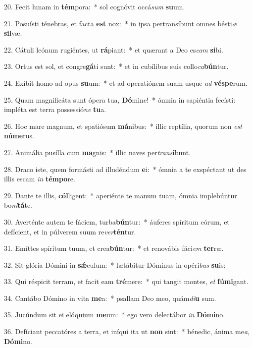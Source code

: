 20. Fecit lunam in \textbf{tém}pora:~*  sol cognóvit occá\textit{sum} \textbf{su}um.\

21. Posuísti ténebras, et facta \textbf{est} nox:~*  in ipsa pertransíbunt omnes bésti\textit{æ} \textbf{sil}væ.\

22. Cátuli leónum rugiéntes, ut \textbf{rá}piant:~*  et quærant a Deo es\textit{cam} \textbf{si}bi.\

23. Ortus est sol, et congre\textbf{gá}ti sunt:~*  et in cubílibus suis collo\textit{ca}\textbf{bún}tur.\

24. Exíbit homo ad opus \textbf{su}um:~*  et ad operatiónem suam usque \textit{ad} \textbf{vés}\textbf{pe}rum.\

25. Quam magnificáta sunt ópera tua, \textbf{Dó}mine!~*  ómnia in sapiéntia fecísti: impléta est terra possessió\textit{ne} \textbf{tu}a.\

26. Hoc mare magnum, et spatiósum \textbf{má}nibus:~*  illic reptília, quorum non \textit{est} \textbf{nú}\textbf{me}rus.\

27. Animália pusílla cum \textbf{ma}gnis:~*  illic naves per\textit{trans}\textbf{í}bunt.\

28. Draco iste, quem formásti ad illudéndum \textbf{e}i:~*  ómnia a te exspéctant ut des illis escam \textit{in} \textbf{tém}\textbf{po}re.\

29. Dante te illis, \textbf{cól}ligent:~*  aperiénte te manum tuam, ómnia implebúntur bo\textit{ni}\textbf{tá}te.\

30. Averténte autem te fáciem, turba\textbf{bún}tur:~*  áuferes spíritum eórum, et defícient, et in púlverem suum re\textit{ver}\textbf{tén}tur.\

31. Emíttes spíritum tuum, et crea\textbf{bún}tur:~*  et renovábis fáci\textit{em} \textbf{ter}ræ.\

32. Sit glória Dómini in \textbf{sǽ}culum:~*  lætábitur Dóminus in opéri\textit{bus} \textbf{su}is:\

33. Qui réspicit terram, et facit eam \textbf{tré}mere:~*  qui tangit montes, \textit{et} \textbf{fú}\textbf{mi}gant.\

34. Cantábo Dómino in vita \textbf{me}a:~*  psallam Deo meo, quám\textit{di}\textbf{u} sum.\

35. Jucúndum sit ei elóquium \textbf{me}um:~*  ego vero delectábor \textit{in} \textbf{Dó}\textbf{mi}no.\

36. Defíciant peccatóres a terra, et iníqui ita ut \textbf{non} sint:~*  bénedic, ánima me\textit{a}, \textbf{Dó}\textbf{mi}no.\

